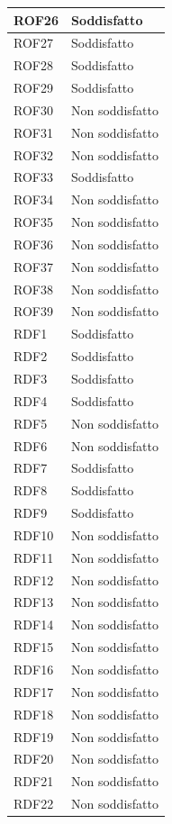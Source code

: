 \begin{longtable}{| p{2.5cm} | p{3cm} |}
	ROF26 & Soddisfatto \\ \hline
	ROF27 & Soddisfatto \\ \hline
	ROF28 & Soddisfatto \\ \hline
	ROF29 & Soddisfatto \\ \hline
	ROF30 & Non soddisfatto \\ \hline
	ROF31 & Non soddisfatto \\ \hline
	ROF32 & Non soddisfatto \\ \hline
	ROF33 & Soddisfatto \\ \hline
	ROF34 & Non soddisfatto \\ \hline
	ROF35 & Non soddisfatto \\ \hline
	ROF36 & Non soddisfatto \\ \hline
	ROF37 & Non soddisfatto \\ \hline
	ROF38 & Non soddisfatto \\ \hline
	ROF39 & Non soddisfatto \\ \hline
	RDF1 & Soddisfatto \\ \hline
	RDF2 & Soddisfatto \\ \hline
	RDF3 & Soddisfatto \\ \hline
	RDF4 & Soddisfatto \\ \hline
	RDF5 & Non soddisfatto \\ \hline
	RDF6 & Non soddisfatto \\ \hline
	RDF7 & Soddisfatto \\ \hline
	RDF8 & Soddisfatto \\ \hline
	RDF9 & Soddisfatto \\ \hline
	RDF10 & Non soddisfatto \\ \hline
	RDF11 & Non soddisfatto \\ \hline
	RDF12 & Non soddisfatto \\ \hline
	RDF13 & Non soddisfatto \\ \hline
	RDF14 & Non soddisfatto \\ \hline
	RDF15 & Non soddisfatto \\ \hline
	RDF16 & Non soddisfatto \\ \hline
	RDF17 & Non soddisfatto \\ \hline
	RDF18 & Non soddisfatto \\ \hline
	RDF19 & Non soddisfatto \\ \hline
	RDF20 & Non soddisfatto \\ \hline
	RDF21 & Non soddisfatto \\ \hline
	RDF22 & Non soddisfatto \\ \hline

\end{longtable}
